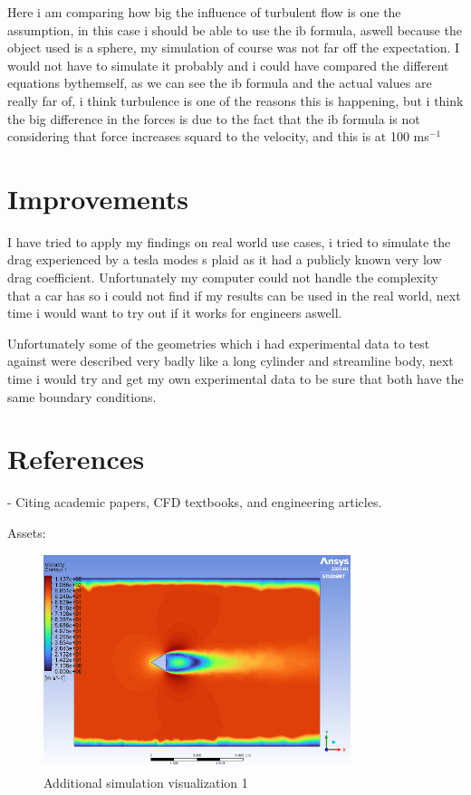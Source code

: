 \documentclass[12pt,a4paper]{article}
\begin{document}
Here i am comparing how big the influence of turbulent flow is one the assumption, in this case i should be able to use the ib formula, aswell because the object used is a sphere, my simulation of course was not far off the expectation. I would not have to simulate it probably and i could have compared the different equations bythemself, as we can see the ib formula and the actual values are really far of, i think turbulence is one of the reasons this is happening, but i think the big difference in the forces is due to the fact that the ib formula is not considering that force increases squard to the velocity, and this is at 100 ms$^{-1}$

\section{Improvements}

I have tried to apply my findings on real world use cases, i tried to simulate the drag experienced by a tesla modes s plaid as it had a publicly known very low drag coefficient. Unfortunately my computer could not handle the complexity that a car has so i could not find if my results can be used in the real world, next time i would want to try out if it works for engineers aswell. 

Unfortunately some of the geometries which i had experimental data to test against were described very badly like a long cylinder and streamline body, next time i would try and get my own experimental data to be sure that both have the same boundary conditions. 

\section{References}

- Citing academic papers, CFD textbooks, and engineering articles.

Assets:

\begin{figure}[H]
\centering
\includegraphics[width=0.8\textwidth]{image3.png}
\caption{Additional simulation visualization 1}
\end{figure}
\end{document}
